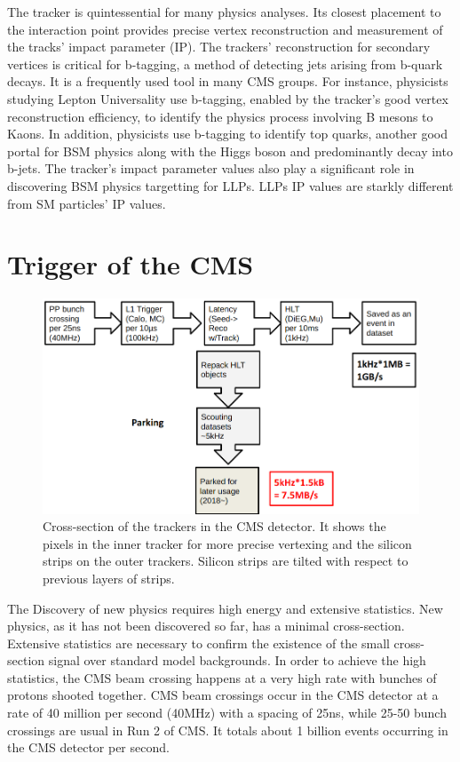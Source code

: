 The tracker is quintessential for many physics analyses.
Its closest placement to the interaction point provides precise vertex reconstruction and measurement of the tracks' impact parameter (IP).
The trackers' reconstruction for secondary vertices is critical for b-tagging, a method of detecting jets arising from b-quark decays.
It is a frequently used tool in many CMS groups.
For instance, physicists studying Lepton Universality use b-tagging, enabled by the tracker's good vertex reconstruction efficiency, to identify the physics process involving B mesons to Kaons.
In addition, physicists use b-tagging to identify top quarks, another good portal for BSM physics along with the Higgs boson and predominantly decay into b-jets.
The tracker's impact parameter values also play a significant role in discovering BSM physics targetting for LLPs.
LLPs IP values are starkly different from SM particles' IP values.


\section{Trigger of the CMS}
\begin{figure}[h!]
	\caption{Cross-section of the trackers in the CMS detector. It shows the pixels in the inner tracker for more precise vertexing and the silicon strips on the outer trackers. Silicon strips are tilted with respect to previous layers of strips. \cite{trk}}
  \label{fig:trig}
  \centering
  \includegraphics[width=0.95\linewidth]{figs/Trig.png}
\end{figure}
The Discovery of new physics requires high energy and extensive statistics.
New physics, as it has not been discovered so far, has a minimal cross-section.
Extensive statistics are necessary to confirm the existence of the small cross-section signal over standard model backgrounds.
In order to achieve the high statistics, the CMS beam crossing happens at a very high rate with bunches of protons shooted together.
CMS beam crossings occur in the CMS detector at a rate of 40 million per second (40MHz) with a spacing of 25ns, while 25-50 bunch crossings are usual in Run 2 of CMS.
It totals about 1 billion events occurring in the CMS detector per second.

